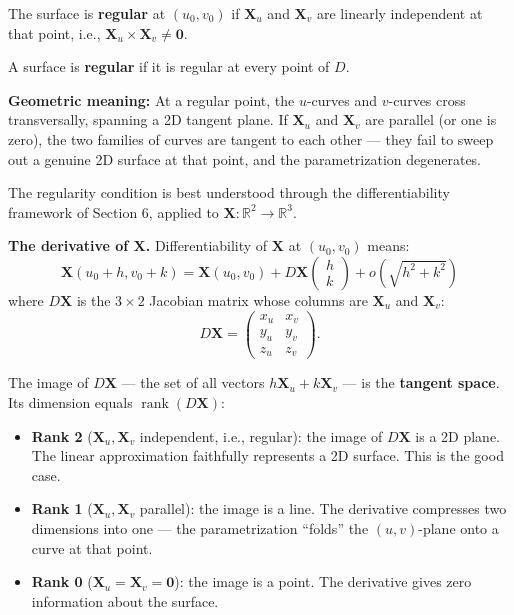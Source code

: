 \documentclass[11pt]{report}
\newcommand{\R}{\mathbb{R}}
\begin{document}
\begin{definition}
The surface is \textbf{regular} at $(u_0, v_0)$ if $\mathbf{X}_u$ and $\mathbf{X}_v$ are linearly independent at that point, i.e., $\mathbf{X}_u \times \mathbf{X}_v \neq \mathbf{0}$.

A surface is \textbf{regular} if it is regular at every point of $D$.
\end{definition}

\textbf{Geometric meaning:} At a regular point, the $u$-curves and $v$-curves cross transversally, spanning a 2D tangent plane. If $\mathbf{X}_u$ and $\mathbf{X}_v$ are parallel (or one is zero), the two families of curves are tangent to each other --- they fail to sweep out a genuine 2D surface at that point, and the parametrization degenerates.

\begin{remark}
The regularity condition is best understood through the differentiability framework of Section 6, applied to $\mathbf{X}: \R^2 \to \R^3$.

\textbf{The derivative of $\mathbf{X}$.} Differentiability of $\mathbf{X}$ at $(u_0, v_0)$ means:
\[
\mathbf{X}(u_0 + h, v_0 + k) = \mathbf{X}(u_0, v_0) + D\mathbf{X} \begin{pmatrix} h \\ k \end{pmatrix} + o\!\left(\sqrt{h^2 + k^2}\right)
\]
where $D\mathbf{X}$ is the $3 \times 2$ Jacobian matrix whose columns are $\mathbf{X}_u$ and $\mathbf{X}_v$:
\[
D\mathbf{X} = \begin{pmatrix} x_u & x_v \\ y_u & y_v \\ z_u & z_v \end{pmatrix}.
\]

The image of $D\mathbf{X}$ --- the set of all vectors $h \mathbf{X}_u + k \mathbf{X}_v$ --- is the \textbf{tangent space}. Its dimension equals $\operatorname{rank}(D\mathbf{X})$:
\begin{itemize}
    \item \textbf{Rank 2} ($\mathbf{X}_u, \mathbf{X}_v$ independent, i.e., regular): the image of $D\mathbf{X}$ is a 2D plane. The linear approximation faithfully represents a 2D surface. This is the good case.
    \item \textbf{Rank 1} ($\mathbf{X}_u, \mathbf{X}_v$ parallel): the image is a line. The derivative compresses two dimensions into one --- the parametrization ``folds'' the $(u,v)$-plane onto a curve at that point.
    \item \textbf{Rank 0} ($\mathbf{X}_u = \mathbf{X}_v = \mathbf{0}$): the image is a point. The derivative gives zero information about the surface.
\end{itemize}


\end{remark}
\end{document}
